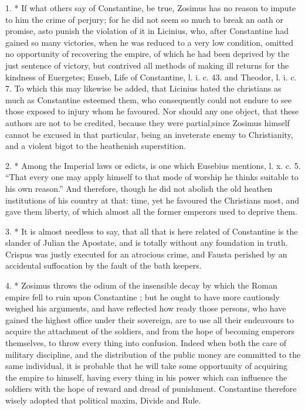 1. * If what others say of Constantine, be true, Zosimus has no reason to impute to him the crime of perjury; for he did not seem so much to break an oath or promise, as\emph{}to punish the violation of it in Licinius, who, after Constantine had gained so many victories, when he was reduced to a very low condition, omitted no opportunity of recovering the empire, of which he had been deprived by the just sentence of victory, but contrived all methods of making ill returns for the kindness of Euergetes; Euseb, Life of Constantine, l. i. c. 43. and Theodor,
l. i. c. 7. To which this may likewise be added, that Licinius hated the christians as much as Constantine esteemed them, who consequently could not endure to see those exposed to injury whom he favoured. Nor should any one object, that these authors are not to be credited, because they were partial\emph{;}since Zosimus himself cannot be excused in that particular, being an inveterate enemy to Christianity, and a violent bigot to the heathenish
superstition.

2. * Among the Imperial laws or edicts, is one which Eusebius mentions,
l. x. c. 5. ``That every one may apply himself to that mode of worship he thinks suitable to his own reason.'' And therefore, though he did not abolish the old heathen institutions of his country at that: time, yet he favoured the Christians most, and gave them liberty, of which almost all the former emperors used to deprive them.

3. * It is almost needless to say, that all that is here related of Constantine is
the slander of Julian the Apostate, and is totally without any foundation in truth.
Crispus was justly executed for an atrocious crime, and Fausta perished by an accidental suffocation by the fault of the bath keepers.

4. * Zosimus throws the odium of the insensible decay by which the Roman empire fell to ruin upon Constantine ; but he ought to have more cautiously
weighed his arguments, and have reflected how ready those persons, who have gained the highest office under their sovereign, are to use all their endeavours to acquire the attachment of the soldiers, and from the hope of becoming emperors themselves, to throw every thing into confusion. Indeed when both the care of military discipline, and the distribution of the public money are committed to the same individual, it is probable that he will take some opportunity of acquiring the empire to himself, having every thing in his power which can influence the soldiers with the hope of reward and dread of punishment. Constantine therefore wisely adopted that political maxim, Divide and Rule.


